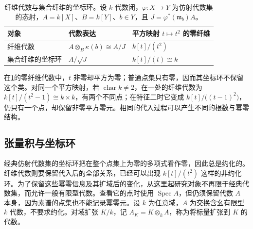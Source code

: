 \begin{table}[htbp]
	\centering
	\caption[纤维代数与集合纤维的坐标环]{纤维代数与集合纤维的坐标环。设 \(k\) 代数闭，\(\varphi:X\to Y\) 为仿射代数集的态射，\(A=k[X]\)、\(B=k[Y]\)、\(b\in Y\)，且 \(J=\varphi^*(\mathfrak m_b)A\)。}
	\label{b3:tab:fiber-algebra-and-reduction}
	\begin{tabularx}{\textwidth}{@{}l>{\raggedright\arraybackslash}X>{\raggedright\arraybackslash}p{}@{}}
		\toprule
		对象 & 代数表达 & 平方映射 \(t\mapsto t^2\) 的零纤维 \\
		\midrule
		纤维代数 & \(A\otimes_B\kappa(b)\cong A/J\) & \(k[t]/(t^2)\) \\
		集合纤维的坐标环 & \(A/\sqrt J\) & \(k[t]/(t)\cong k\) \\
		\bottomrule
	\end{tabularx}
\end{table}

在\cref{b3:tab:fiber-algebra-and-reduction}的零纤维代数中，\(\bar t\) 非零却平方为零；普通点集只有零，因而其坐标环不保留这个类。对同一个平方映射，若 \(\operatorname{char}k\ne2\)，在一处的纤维代数为 \(k[t]/(t^2-1)\cong k\times k\)，有两个不同点；在特征二时它变成 \(k[t]/\bigl((t-1)^2\bigr)\)，仍只有一个点，却保留非零平方零元。相同的代入过程可以产生不同的根数与幂零结构。

\subsection{张量积与坐标环}
\label{b3:subsec:0703:02}

经典仿射代数集的坐标环把在整个点集上为零的多项式看作零，因此总是约化的。纤维代数则要保留代入后的全部关系，已经可以出现 \(k[t]/(t^2)\) 这样的非约化环。为了保留这些幂零信息及其扩域后的变化，从这里起研究对象不再限于经典代数集，而允许一般有限型代数。查看它的点时使用 \(\operatorname{Spec}A\)，但仍须保留代数 \(A\) 本身，因为素谱的点集也不能记录幂零元。设 \(k\) 为任意域，\(A\) 为交换含幺有限型 \(k\) 代数，不要求约化。对域扩张 \(K/k\)，记 \(A_K=K\otimes_kA\)，称为将标量扩张到 \(K\) 的代数。

